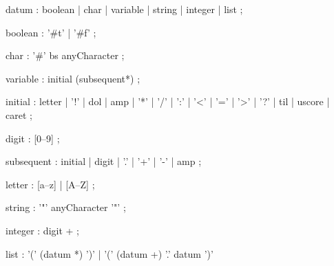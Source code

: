 \begin{rail}
  datum : boolean
  | char
  | variable
  | string
  | integer
  | list
  ;

  boolean : '\#t' | '\#f' ;

  char : '\#' bs anyCharacter ;

  variable : initial (subsequent*) ;

  initial : letter | '!' | dol | amp | '*' | '/' | ':' | '<' | '=' | '>' | '?' | til | uscore | caret ;

  digit : [0--9] ;

  subsequent : initial | digit | '.' | '+' | '-' | amp ;

  letter : [a--z] | [A--Z] ;

  string : '"' anyCharacter '"' ;

  integer : digit + ;

  list : '(' (datum *) ')' | '(' (datum +) '.' datum ')'

\end{rail}
